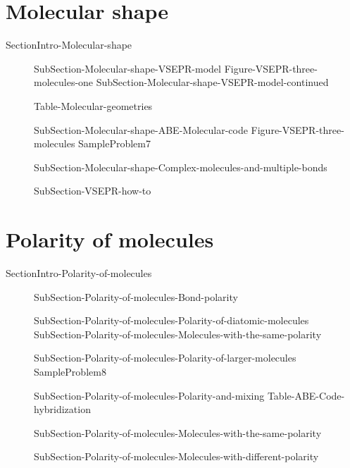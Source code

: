 \documentclass[main.tex]{subfiles}
\begin{document}
\section{Molecular shape}{SectionIntro-Molecular-shape}
\sloppy\begin{description}
\item[] {SubSection-Molecular-shape-VSEPR-model}
{Figure-VSEPR-three-molecules-one}
 {SubSection-Molecular-shape-VSEPR-model-continued}
 
{Table-Molecular-geometries}
\item[] {SubSection-Molecular-shape-ABE-Molecular-code}
{Figure-VSEPR-three-molecules}
{SampleProblem7}
\item[] {SubSection-Molecular-shape-Complex-molecules-and-multiple-bonds}
\item[]{SubSection-VSEPR-how-to}  


\end{description}
\section{Polarity of molecules}{SectionIntro-Polarity-of-molecules}
\sloppy \begin{description}
\item[] {SubSection-Polarity-of-molecules-Bond-polarity}
\item[] {SubSection-Polarity-of-molecules-Polarity-of-diatomic-molecules}
{SubSection-Polarity-of-molecules-Molecules-with-the-same-polarity}
\item[] {SubSection-Polarity-of-molecules-Polarity-of-larger-molecules}
{SampleProblem8}
\item[] {SubSection-Polarity-of-molecules-Polarity-and-mixing}
{Table-ABE-Code-hybridization}
\item[] {SubSection-Polarity-of-molecules-Molecules-with-the-same-polarity}
\item[] {SubSection-Polarity-of-molecules-Molecules-with-different-polarity}
\end{description}
\end{document}
